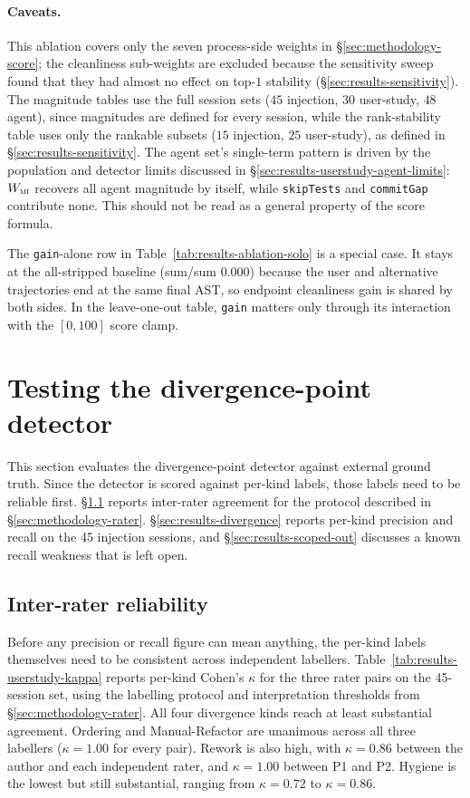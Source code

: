 \paragraph{Caveats.}
This ablation covers only the seven process-side weights in \S\ref{sec:methodology-score}; the cleanliness sub-weights are excluded because the sensitivity sweep found that they had almost no effect on top-$1$ stability (\S\ref{sec:results-sensitivity}). The magnitude tables use the full session sets ($45$ injection, $30$ user-study, $48$ agent), since magnitudes are defined for every session, while the rank-stability table uses only the rankable subsets ($15$ injection, $25$ user-study), as defined in §\ref{sec:results-sensitivity}. The agent set's single-term pattern is driven by the population and detector limits discussed in \S\ref{sec:results-userstudy-agent-limits}: $W_{\textsc{mi}}$ recovers all agent magnitude by itself, while \texttt{skipTests} and \texttt{commitGap} contribute none. This should not be read as a general property of the score formula.

The \texttt{gain}-alone row in Table~\ref{tab:results-ablation-solo} is a special case. It stays at the all-stripped baseline (sum/sum $0.000$) because the user and alternative trajectories end at the same final AST, so endpoint cleanliness gain is shared by both sides. In the leave-one-out table, \texttt{gain} matters only through its interaction with the $[0,100]$ score clamp.


\section{Testing the divergence-point detector}
\label{sec:results-detector}

This section evaluates the divergence-point detector against external ground truth. Since the detector is scored against per-kind labels, those labels need to be reliable first. \S\ref{sec:results-kappa} reports inter-rater agreement for the protocol described in \S\ref{sec:methodology-rater}. \S\ref{sec:results-divergence} reports per-kind precision and recall on the 45 injection sessions, and \S\ref{sec:results-scoped-out} discusses a known recall weakness that is left open.

\subsection{Inter-rater reliability}
\label{sec:results-kappa}
Before any precision or recall figure can mean anything, the per-kind labels themselves need to be consistent across independent labellers. Table~\ref{tab:results-userstudy-kappa} reports per-kind Cohen's $\kappa$ for the three rater pairs on the 45-session set, using the labelling protocol and interpretation thresholds from \S\ref{sec:methodology-rater}. All four divergence kinds reach at least substantial agreement. Ordering and Manual-Refactor are unanimous across all three labellers ($\kappa = 1.00$ for every pair). Rework is also high, with $\kappa = 0.86$ between the author and each independent rater, and $\kappa = 1.00$ between P1 and P2. Hygiene is the lowest but still substantial, ranging from $\kappa = 0.72$ to $\kappa = 0.86$.

